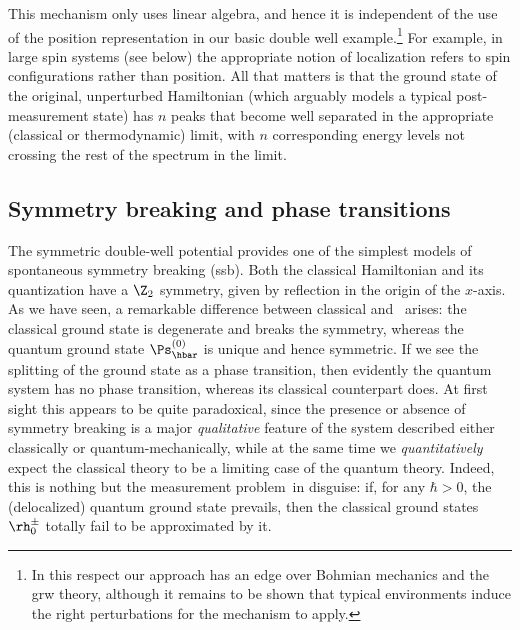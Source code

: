 \documentclass[12pt]{article}
\newcommand{\mmp}{measurement problem}
\begin{document}
This mechanism only uses linear algebra, and hence it is independent of the use of the position representation in our basic double well example.\footnote{ In this respect our approach has an edge over Bohmian mechanics and the {\sc grw} theory, although it remains to be shown that typical environments induce the right perturbations for the mechanism to apply.} For example, in large spin systems (see below) the appropriate notion of localization refers to spin configurations rather than position. All that matters is that
the ground state of the original,  unperturbed Hamiltonian (which arguably models a typical post-measurement state) has $n$ peaks that become well separated in the appropriate (classical or thermodynamic) limit, with $n$ corresponding energy levels not crossing the rest of the spectrum in the limit.\subsection{Symmetry breaking and phase transitions}\label{SBPT}
The symmetric double-well potential  provides one of the simplest models of spontaneous symmetry breaking ({\sc ssb}). Both the classical Hamiltonian  and 
 its quantization  have a $\Z_2$ symmetry, given by reflection in the origin of the $x$-axis. 
As we have seen, a remarkable difference between classical and \qm\ arises:
 the classical ground state is degenerate and breaks the symmetry, whereas the quantum ground state $\Ps^{(0)}_{\hbar}$ is unique and hence symmetric. If we see the splitting of the ground state as a phase transition,  then evidently the quantum system has no phase transition, whereas its classical counterpart does. At first sight this appears to be quite paradoxical, since the presence or absence of symmetry breaking is a major \emph{qualitative} feature of the system described either classically or quantum-mechanically, while at the same time we \emph{quantitatively} expect the classical theory to be a limiting case of the quantum theory. Indeed, this is nothing but the \mmp\ in disguise: if, for any $\hbar>0$, the (delocalized) quantum ground state prevails, then the classical ground states $\rh_0^{\pm}$ totally fail to be approximated by it.  
 
\end{document}
